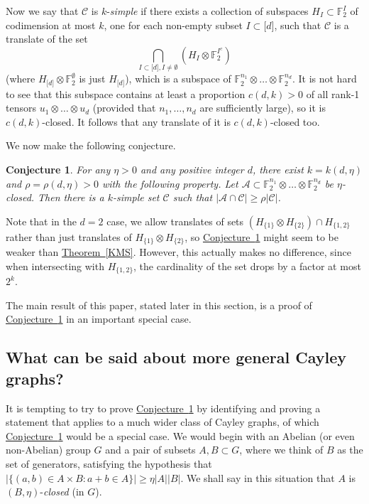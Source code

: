 \documentclass[11pt]{article}
\numberwithin{equation}{section}
\newtheorem{conjecture}[theorem]{Conjecture}
\theoremstyle{definition}
\theoremstyle{plain}
\newcommand{\expref}[2]{\hyperref[#2]{#1~\ref{#2}}}
\newcommand\F{\mathbb{F}}
\newcommand \cA{\mathcal A}
\newcommand \cC{\mathcal C}
\newcommand \s{\subset}
\begin{document}
Now we say that $\cC$ is $k$-\emph{simple} if there exists a collection of subspaces $H_I\s\F_2^I$ of codimension at most $k$, one for each non-empty subset  $I\s \lbrack d\rbrack$, such that $\cC$ is a translate of the set
\[
  \bigcap_{I\s \lbrack d\rbrack,I\neq \emptyset}(H_I\otimes \F_2^{I^c})
\]
(where $H_{\lbrack d \rbrack}\otimes \F_2^{\emptyset}$ is just
$H_{\lbrack d\rbrack}$), which is a subspace of
$\F_2^{n_1}\otimes \dots \otimes \F_2^{n_d}$. It is not hard to see
that this subspace contains at least a proportion $c(d,k)>0$ of all
rank-1 tensors $u_1\otimes \dots \otimes u_d$ (provided that
$n_1,\dots,n_d$ are sufficiently large), so it is $c(d,k)$-closed. It
follows that any translate of it is $c(d,k)$-closed too.

We now make the following conjecture.

\begin{conjecture} \label{mainconjecture}
	For any $\eta>0$ and any positive integer $d$, there exist $k=k(d,\eta)$ and $\rho=\rho(d,\eta)>0$ with the following property. Let $\cA\s \F_2^{n_1}\otimes \dots \otimes \F_2^{n_d}$ be $\eta$-closed. Then there is a $k$-simple set $\cC$ such that $|\cA\cap \cC|\geq \rho|\cC|$.
\end{conjecture}

\noindent Note that in the $d=2$ case, we allow translates of sets $(H_{\{1\}}\otimes H_{\{2\}})\cap H_{\{1,2\}}$ rather than just translates of $H_{\{1\}}\otimes H_{\{2\}}$, so \expref{Conjecture}{mainconjecture} might seem to be weaker than \expref{Theorem}{KMS}. However, this actually makes no difference, since when intersecting with $H_{\{1,2\}}$, the cardinality of the set drops by a factor at most $2^k$.

The main result of this paper, stated later in this section, is a proof of \expref{Conjecture}{mainconjecture} in an important special case. 

\subsection{What can be said about more general Cayley graphs?}

It is tempting to try to prove \expref{Conjecture}{mainconjecture} by identifying and proving a statement that applies to a much wider class of Cayley graphs, of which \expref{Conjecture}{mainconjecture} would be a special case. We would begin with an Abelian (or even non-Abelian) group $G$ and a pair of subsets $A,B\subset G$, where we think of $B$ as the set of generators, satisfying the hypothesis that $|\{(a,b)\in A\times B: a+b\in A\}|\geq\eta|A||B|$. We shall say in this situation that $A$ is $(B,\eta)$-\emph{closed} (in $G$).
\end{document}
